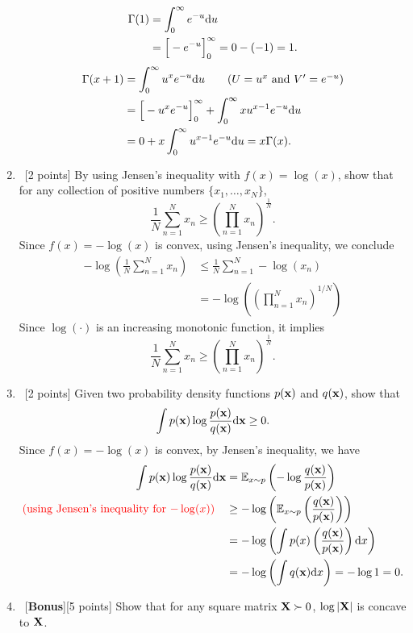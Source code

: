 \documentclass[12pt, fullpage,letterpaper]{article}
\def\red{\color{red}}
\def\blackblue{\color{black!40!blue}}
\begin{document}
\begin{enumerate}
{\blackblue\noindent 
\begin{align*}
\Gamma(1) & =  \int_0^\infty e^{-u} {\rm d} u\\
& = \Big[-e^{-u}\Big]_{0}^{\infty} = 0 - (-1)  = 1.
\end{align*}
\begin{align*}
\Gamma(x+1) & =  \int_0^\infty u^x e^{-u} {\rm d} u\quad\quad \mbox{($U= u^x$ and $V' = e^{-u}$)}\\
& = \Big[-u^xe^{-u}\Big]_0^\infty + \int_0^\infty xu^{x-1} e^{-u} {\rm d} u\\
& = 0 + x\int_0^\infty u^{x-1} e^{-u} {\rm d} u = x\Gamma(x).
\end{align*}
}
\item~[2 points] By using Jensen's inequality with $f(x) = \log(x)$, show that for any collection of positive numbers $\{x_1, \ldots, x_N\}$,
$$\frac{1}{N}\sum_{n=1}^N x_n \ge \left(\prod_{n=1}^N x_n\right)^{\frac{1}{N}}.$$
{\blackblue\noindent 
Since $f(x) = -\log(x)$ is convex, using Jensen's inequality, we conclude 
\begin{align*}
-\log\left(\frac{1}{N}\sum_{n=1}^N x_n\right) 
& \leq \frac{1}{N}\sum_{n=1}^N -\log(x_n)\\
& = -\log\left(\left(\prod_{n=1}^N x_n\right)^{1/N}\right)
\end{align*}
Since $\log(\cdot)$ is an increasing monotonic function, it implies  
$$\frac{1}{N}\sum_{n=1}^N x_n \ge \left(\prod_{n=1}^N x_n\right)^{\frac{1}{N}}.$$
}
\item~[2 points] Given two probability density functions $p({\bf x})$ and $q({\bf x})$, show that $$\int p({\bf x})\log\frac{p({\bf x})}{q({\bf x})}{\rm d} {\bf x} \ge 0.$$
{\blackblue\noindent 
Since $f(x) = -\log(x)$ is convex, by Jensen's inequality, we have 
\begin{align*}
\int p(\x)\log\frac{p(\x)}{q(\x)}\d \x
& = \EE_{x\sim p}\left(-\log \frac{q(\x)}{p(\x)}\right)\\
\mbox{\red (using Jensen's inequality for $-\log(x)$)}\quad & \geq -\log\left(\EE_{x\sim p}\left(\frac{q(\x)}{p(\x)}\right)\right)\\
& = -\log\left(\int p(x)\left(\frac{q(\x)}{p(\x)}\right)\d x\right)\\
& = -\log\left(\int q(\x)\d x\right) = -\log 1 = 0.
\end{align*}
}
\item~[\textbf{Bonus}][5 points] Show that for any square matrix ${\bf X} \succ 0$, $\log\left| {\bf X} \right|$ is concave to ${\bf X}$. 
\end{enumerate}
\end{document}
